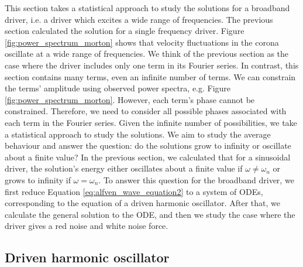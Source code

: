 This section takes a statistical approach to study the solutions for a broadband driver, i.e. a driver which excites a wide range of frequencies. The previous section calculated the solution for a single frequency driver. Figure \ref{fig:power_spectrum_morton} shows that velocity fluctuations in the corona oscillate at a wide range of frequencies. We think of the previous section as the case where the driver includes only one term in its Fourier series. In contrast, this section contains many terms, even an infinite number of terms. We can constrain the terms' amplitude using observed power spectra, e.g. Figure \ref{fig:power_spectrum_morton}. However, each term's phase cannot be constrained. Therefore, we need to consider all possible phases associated with each term in the Fourier series. Given the infinite number of possibilities, we take a statistical approach to study the solutions. We aim to study the average behaviour and answer the question: do the solutions grow to infinity or oscillate about a finite value? In the previous section, we calculated that for a sinusoidal driver, the solution's energy either oscillates about a finite value if $\omega\ne\omega_n$ or grows to infinity if $\omega=\omega_n$. To answer this question for the broadband driver, we first reduce Equation \eqref{eq:alfven_wave_equation2} to a system of ODEs, corresponding to the equation of a driven harmonic oscillator. After that, we calculate the general solution to the ODE, and then we study the case where the driver gives a red noise and white noise force.

\subsection{Driven harmonic oscillator}
\label{sec:chap_2_driven_harmonic_oscillator}

